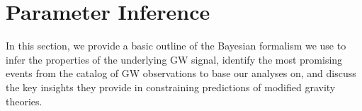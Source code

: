 \documentclass[twocolumn,
               prd,
               aps,
               superscriptaddress,
               tightenlines,
               nofootinbib,
               eqsecnum,
               amsfonts,
               amsmath,
               longbibliography]{revtex4-1}
\begin{document}

\section{Parameter Inference}
\label{sec:pe}
% 

In this section, we provide a basic outline of the Bayesian formalism we use to
infer the properties of the underlying GW signal, identify the most promising
events from the catalog of GW observations to base our analyses on, and discuss
the key insights they provide in constraining predictions of modified gravity
theories.
\end{document}
